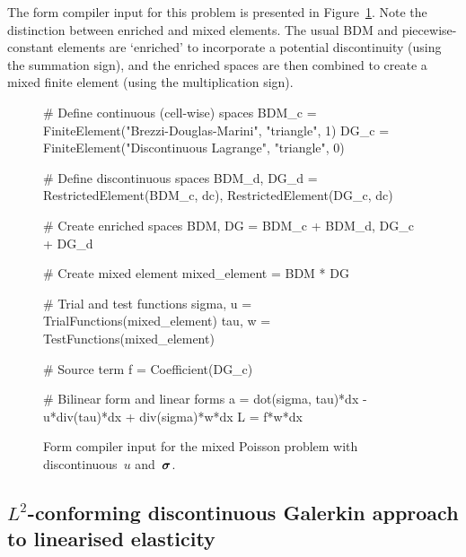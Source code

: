The form compiler input for this problem is presented in
Figure~\ref{code:nikbakht:mixed-Poisson}.  Note the distinction between
enriched and mixed elements.  The usual BDM and piecewise-constant
elements are `enriched' to incorporate a potential discontinuity (using
the summation sign), and the enriched spaces are then combined to create
a mixed finite element (using the multiplication sign).
%
\begin{figure}
\begin{python}
# Define continuous (cell-wise) spaces
BDM_c = FiniteElement("Brezzi-Douglas-Marini", "triangle", 1)
DG_c  = FiniteElement("Discontinuous Lagrange", "triangle", 0)

# Define discontinuous spaces
BDM_d, DG_d = RestrictedElement(BDM_c, dc), RestrictedElement(DG_c, dc)

# Create enriched spaces
BDM, DG = BDM_c + BDM_d, DG_c + DG_d

# Create mixed element
mixed_element = BDM * DG

# Trial and test functions
sigma, u = TrialFunctions(mixed_element)
tau, w   = TestFunctions(mixed_element)

# Source term
f = Coefficient(DG_c)

# Bilinear form and linear forms
a = dot(sigma, tau)*dx - u*div(tau)*dx + div(sigma)*w*dx
L = f*w*dx
\end{python}
\caption{Form compiler input for the mixed Poisson problem with
discontinuous~$u$ and~$\boldsymbol{\sigma}$.}
\label{code:nikbakht:mixed-Poisson}
\end{figure}

\subsection{$L^{2}$-conforming discontinuous Galerkin approach to
linearised elasticity}

